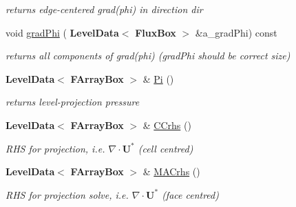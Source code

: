 \begin{DoxyCompactItemize}
\begin{DoxyCompactList}\small\item\em returns edge-\/centered grad(phi) in direction dir \end{DoxyCompactList}\item 
\mbox{\label{class_projector_a488492af7d2aca796610a7e7cf836263}} 
void \hyperlink{class_projector_a488492af7d2aca796610a7e7cf836263}{grad\+Phi} (\textbf{ Level\+Data}$<$ \textbf{ Flux\+Box} $>$ \&a\+\_\+grad\+Phi) const
\begin{DoxyCompactList}\small\item\em returns all components of grad(phi) (grad\+Phi should be correct size) \end{DoxyCompactList}\item 
\mbox{\label{class_projector_aa5da43cdd9b4e8c56835ac9a3ba582c9}} 
\textbf{ Level\+Data}$<$ \textbf{ F\+Array\+Box} $>$ \& \hyperlink{class_projector_aa5da43cdd9b4e8c56835ac9a3ba582c9}{Pi} ()
\begin{DoxyCompactList}\small\item\em returns level-\/projection pressure \end{DoxyCompactList}\item 
\mbox{\label{class_projector_ae27ef8f42b654c28d9d2a2e88d67bf37}} 
\textbf{ Level\+Data}$<$ \textbf{ F\+Array\+Box} $>$ \& \hyperlink{class_projector_ae27ef8f42b654c28d9d2a2e88d67bf37}{C\+Crhs} ()
\begin{DoxyCompactList}\small\item\em R\+HS for projection, i.\+e. $ \nabla \cdot \mathbf{U}^* $ (cell centred) \end{DoxyCompactList}\item 
\mbox{\label{class_projector_a34940ed1f5599a8d7d8dd518bf41c3f8}} 
\textbf{ Level\+Data}$<$ \textbf{ F\+Array\+Box} $>$ \& \hyperlink{class_projector_a34940ed1f5599a8d7d8dd518bf41c3f8}{M\+A\+Crhs} ()
\begin{DoxyCompactList}\small\item\em R\+HS for projection solve, i.\+e. $ \nabla \cdot \mathbf{U}^* $ (face centred) \end{DoxyCompactList}\item 
\mbox{\label{class_projector_a65dfc7e4b02b93b2f7783754998bf4ee}} 

\end{DoxyCompactItemize}

